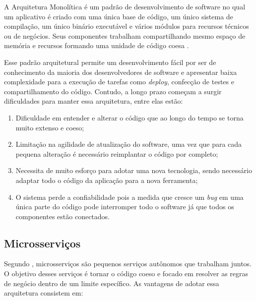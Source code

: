 A Arquitetura Monolítica é um padrão de desenvolvimento de software no qual um aplicativo
é criado com uma única base de código, um único sistema de compilação, um único binário
executável e vários módulos para recursos técnicos ou de negócios. Seus componentes
trabalham compartilhando mesmo espaço de memória e recursos formando uma unidade de
código coesa \cite{NatalliaSakovich}.

Esse padrão arquitetural permite um desenvolvimento fácil por ser de conhecimento
da maioria dos desenvolvedores de software e apresentar baixa complexidade para a
execução de tarefas como \textit{deploy}, confecção de testes e compartilhamento
do código. Contudo, a longo prazo começam a surgir dificuldades para manter essa
arquitetura, entre elas estão:

  \begin{enumerate}
    \item Dificuldade em entender e alterar o código que ao longo do tempo se torna
    muito extenso e coeso;
    \item Limitação na agilidade de atualização do software, uma vez que para cada
    pequena alteração é necessário reimplantar o código por completo;
    \item Necessita de muito esforço para adotar uma nova tecnologia, sendo
    necessário adaptar todo o código da aplicação para a nova ferramenta;
    \item O sistema perde a confiabilidade pois a medida que cresce um \textit{bug}
    em uma única parte do código pode interromper todo o software já que todos os
    componentes estão conectados.
  \end{enumerate}

\subsection{Microsserviços}

Segundo , microsserviços são pequenos serviços autônomos que
trabalham juntos. O objetivo desses serviços é tornar o código coeso e focado em
resolver as regras de negócio dentro de um limite específico. As vantagens de adotar
essa arquitetura consistem em:

